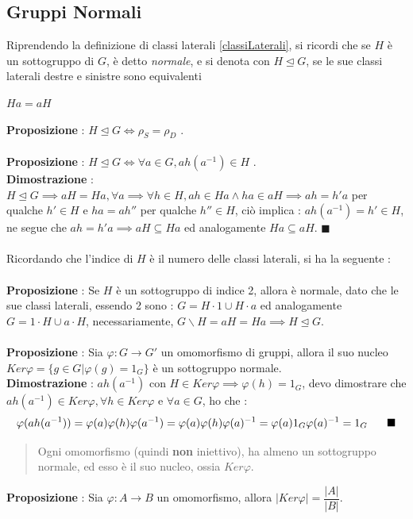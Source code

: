 \documentclass[12pt, letterpaper]{article}
\newcommand{\norm}{{\unlhd}}
\begin{document}
\subsection{Gruppi Normali}
Riprendendo la definizione di classi laterali \ref{classiLaterali}, si ricordi che se \(H\) è un sottogruppo
di \(G\), è detto \textit{normale}, e si denota con \(H\norm G\), se le sue classi laterali destre e sinistre 
sono equivalenti \begin{center}\(Ha=aH\)\end{center} 
\textbf{Proposizione }: \(H\norm G\iff \rho_S = \rho_D\) .\\\hphantom{}\\
\textbf{Proposizione }: \(H\norm G\iff \forall a \in G, ah(a^{-1})\in H\) .\\
\textbf{Dimostrazione} : \(H\norm G\implies aH=Ha, \forall a\implies \forall h\in H, ah\in Ha \land ha\in aH
\implies ah=h'a\) per qualche \(h'\in H\) e \(ha=ah''\) per qualche \(h''\in H\), ciò implica : \(ah(a^{-1})
=h'\in H\), ne segue che \(ah=h'a\implies aH\subseteq Ha\) ed analogamente \( Ha\subseteq aH\). \(\blacksquare\)
\\\hphantom{}\\ Ricordando che l'indice di \(H\) è il numero delle classi laterali, si ha la seguente :\\\hphantom{}\\
\textbf{Proposizione }: Se \(H\) è un sottogruppo di indice 2, allora è normale, dato che le sue classi laterali,
essendo 2 sono : \(G=H\cdot 1\cup H\cdot a\) ed analogamente \(G= 1\cdot H\cup a\cdot H\), necessariamente, 
\(G\backslash H=aH=Ha\implies H\norm G\).\\\hphantom{}\\
\textbf{Proposizione }: Sia \(\varphi : G \rightarrow G'\) un omomorfismo di gruppi, allora il suo nucleo  
\(Ker\varphi=\{g\in G|\varphi(g)=1_G\}\) è un sottogruppo normale.\\
\textbf{Dimostrazione} : \(ah(a^{-1})\) con \(H\in Ker\varphi\implies \varphi(h)=1_G\), devo dimostrare che
\(ah(a^{-1})\in Ker\varphi, \forall h\in Ker\varphi\) e \(\forall a \in G\), ho che : \begin{equation}
    \varphi(ah(a^{-1}))=\varphi(a)\varphi(h)\varphi(a^{-1})=\varphi(a)\varphi(h)\varphi(a)^{-1}=
    \varphi(a)1_G\varphi(a)^{-1}=1_G\text{\hphantom{text}}\blacksquare
\end{equation} 
\begin{quote}
    Ogni omomorfismo (quindi \textbf{non} iniettivo), ha almeno un sottogruppo normale, ed esso 
    è il suo nucleo, ossia \(Ker\varphi\).
\end{quote}
\textbf{Proposizione }: Sia \(\varphi : A\rightarrow B\) un omomorfismo, allora \(|Ker\varphi|=\dfrac{|A|}{|B|}\).
\end{document}
